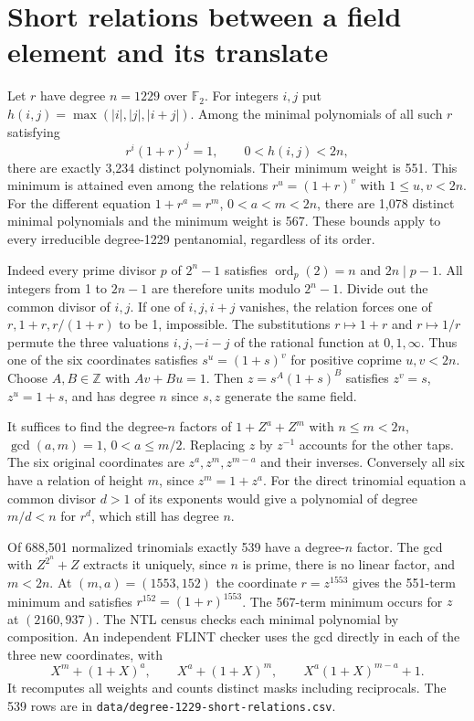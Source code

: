 \documentclass[11pt]{article}
\newcommand{\F}{\mathbb F_2}
\newcommand{\ord}{\operatorname{ord}}
\begin{document}
\section{Short relations between a field element and its translate}
\label{sec:short-translate-relations}
Let \(r\) have degree \(n=1229\) over \(\F\). For integers \(i,j\) put
\(h(i,j)=\max(|i|,|j|,|i+j|)\). Among the minimal polynomials of all
such \(r\) satisfying
\[
               r^i(1+r)^j=1,\qquad 0<h(i,j)<2n,
\]
there are exactly 3,234 distinct polynomials. Their minimum weight is
551. This minimum is attained even among the relations
\(r^u=(1+r)^v\) with \(1\le u,v<2n\). For the different equation
\(1+r^a=r^m\), \(0<a<m<2n\), there are 1,078 distinct minimal
polynomials and the minimum weight is 567. These bounds apply to
every irreducible degree-1229 pentanomial, regardless of its order.

Indeed every prime divisor \(p\) of \(2^n-1\) satisfies
\(\ord_p(2)=n\) and \(2n\mid p-1\). All integers from 1 to \(2n-1\)
are therefore units modulo \(2^n-1\). Divide out the common divisor of
\(i,j\). If one of \(i,j,i+j\) vanishes, the relation forces one of
\(r,1+r,r/(1+r)\) to be 1, impossible. The substitutions \(r\mapsto1+r\)
and \(r\mapsto1/r\) permute the three valuations \(i,j,-i-j\) of the
rational function at \(0,1,\infty\). Thus one of the six coordinates
satisfies \(s^u=(1+s)^v\) for positive coprime \(u,v<2n\).
Choose \(A,B\in\mathbb Z\) with \(Av+Bu=1\). Then
\(z=s^A(1+s)^B\) satisfies \(z^v=s\), \(z^u=1+s\), and has degree
\(n\) since \(s,z\) generate the same field.

It suffices to find the degree-\(n\) factors of \(1+Z^a+Z^m\) with
\(n\le m<2n\), \(\gcd(a,m)=1\), \(0<a\le m/2\). Replacing \(z\) by
\(z^{-1}\) accounts for the other taps. The six original coordinates are
\(z^a,z^m,z^{m-a}\) and their inverses. Conversely all six have a
relation of height \(m\), since \(z^m=1+z^a\). For the direct trinomial
equation a common divisor \(d>1\) of its exponents would give a
polynomial of degree \(m/d<n\) for \(r^d\), which still has degree \(n\).

Of 688,501 normalized trinomials exactly 539 have a degree-\(n\)
factor. The gcd with \(Z^{2^n}+Z\) extracts it uniquely, since \(n\)
is prime, there is no linear factor, and \(m<2n\).
At \((m,a)=(1553,152)\) the coordinate \(r=z^{1553}\) gives the
551-term minimum and satisfies \(r^{152}=(1+r)^{1553}\).
The 567-term minimum occurs for \(z\) at \((2160,937)\).
The NTL census checks each minimal polynomial by composition.
An independent FLINT checker uses the gcd directly in each of the
three new coordinates, with
\[
 X^m+(1+X)^a,\qquad X^a+(1+X)^m,\qquad X^a(1+X)^{m-a}+1.
\]
It recomputes all weights and counts distinct masks including reciprocals.
The 539 rows are in \nolinkurl{data/degree-1229-short-relations.csv}.
\end{document}
